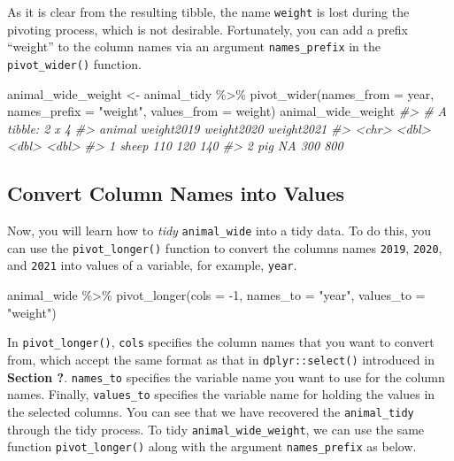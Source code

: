 \documentclass[
]{book}
\newenvironment{Shaded}{\begin{snugshade}}{\end{snugshade}}
\newcommand{\AttributeTok}[1]{\textcolor[rgb]{0.77,0.63,0.00}{#1}}
\newcommand{\CommentTok}[1]{\textcolor[rgb]{0.56,0.35,0.01}{\textit{#1}}}
\newcommand{\DecValTok}[1]{\textcolor[rgb]{0.00,0.00,0.81}{#1}}
\newcommand{\FunctionTok}[1]{\textcolor[rgb]{0.00,0.00,0.00}{#1}}
\newcommand{\NormalTok}[1]{#1}
\newcommand{\OtherTok}[1]{\textcolor[rgb]{0.56,0.35,0.01}{#1}}
\newcommand{\SpecialCharTok}[1]{\textcolor[rgb]{0.00,0.00,0.00}{#1}}
\newcommand{\StringTok}[1]{\textcolor[rgb]{0.31,0.60,0.02}{#1}}
\begin{document}
As it is clear from the resulting tibble, the name \texttt{weight} is lost during the pivoting process, which is not desirable. Fortunately, you can add a prefix ``weight'' to the column names via an argument \texttt{names\_prefix} in the \texttt{pivot\_wider()} function.

\begin{Shaded}
\begin{Highlighting}[]
\NormalTok{animal\_wide\_weight }\OtherTok{\textless{}{-}}\NormalTok{ animal\_tidy }\SpecialCharTok{\%\textgreater{}\%} \FunctionTok{pivot\_wider}\NormalTok{(}\AttributeTok{names\_from =}\NormalTok{ year,}
            \AttributeTok{names\_prefix =} \StringTok{"weight"}\NormalTok{,}
            \AttributeTok{values\_from =}\NormalTok{ weight) }
\NormalTok{animal\_wide\_weight   }
\CommentTok{\#\textgreater{} \# A tibble: 2 x 4}
\CommentTok{\#\textgreater{}   animal weight2019 weight2020 weight2021}
\CommentTok{\#\textgreater{}   \textless{}chr\textgreater{}       \textless{}dbl\textgreater{}      \textless{}dbl\textgreater{}      \textless{}dbl\textgreater{}}
\CommentTok{\#\textgreater{} 1 sheep         110        120        140}
\CommentTok{\#\textgreater{} 2 pig            NA        300        800}
\end{Highlighting}
\end{Shaded}

\hypertarget{tidy-long}{%
\subsection{Convert Column Names into Values}\label{tidy-long}}

Now, you will learn how to \emph{tidy} \texttt{animal\_wide} into a tidy data. To do this, you can use the \texttt{pivot\_longer()} function to convert the columns names \texttt{2019}, \texttt{2020}, and \texttt{2021} into values of a variable, for example, \texttt{year}.

\begin{Shaded}
\begin{Highlighting}[]
\NormalTok{animal\_wide }\SpecialCharTok{\%\textgreater{}\%} 
  \FunctionTok{pivot\_longer}\NormalTok{(}\AttributeTok{cols =} \SpecialCharTok{{-}}\DecValTok{1}\NormalTok{, }
               \AttributeTok{names\_to =} \StringTok{"year"}\NormalTok{, }
               \AttributeTok{values\_to =} \StringTok{"weight"}\NormalTok{)}
\end{Highlighting}
\end{Shaded}

In \texttt{pivot\_longer()}, \texttt{cols} specifies the column names that you want to convert from, which accept the same format as that in \texttt{dplyr::select()} introduced in \textbf{Section ?}. \texttt{names\_to} specifies the variable name you want to use for the column names. Finally, \texttt{values\_to} specifies the variable name for holding the values in the selected columns.
You can see that we have recovered the \texttt{animal\_tidy} through the tidy process. To tidy \texttt{animal\_wide\_weight}, we can use the same function \texttt{pivot\_longer()} along with the argument \texttt{names\_prefix} as below.
\end{document}
